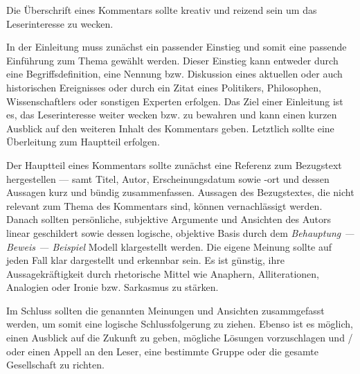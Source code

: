 \begin{enumerate}


	Die \"{U}berschrift eines Kommentars sollte kreativ und reizend sein um das Leserinteresse zu wecken.


	In der Einleitung muss zun\"{a}chst ein passender Einstieg und somit eine passende Einf\"{u}hrung zum Thema gew\"{a}hlt werden. Dieser Einstieg kann entweder durch eine Begriffsdefinition, eine Nennung bzw. Diskussion eines aktuellen oder auch historischen Ereignisses oder durch ein Zitat eines Politikers, Philosophen, Wissenschaftlers oder sonstigen Experten erfolgen. Das Ziel einer Einleitung ist es, das Leserinteresse weiter wecken bzw. zu bewahren und kann einen kurzen Ausblick auf den weiteren Inhalt des Kommentars geben. Letztlich sollte eine \"{U}berleitung zum Hauptteil erfolgen. 


	Der Hauptteil eines Kommentars sollte zun\"{a}chst eine Referenz zum Bezugstext hergestellen --- samt Titel, Autor, Erscheinungsdatum sowie -ort und dessen Aussagen kurz und b\"{u}ndig zusammenfassen. Aussagen des Bezugstextes, die nicht relevant zum Thema des Kommentars sind, k\"{o}nnen vernachl\"{a}ssigt werden. Danach sollten pers\"{o}nliche, subjektive Argumente und Ansichten des Autors linear geschildert sowie dessen logische, objektive Basis durch dem \emph{Behauptung --- Beweis --- Beispiel} Modell klargestellt werden. Die eigene Meinung sollte auf jeden Fall klar dargestellt und erkennbar sein. Es ist g\"{u}nstig, ihre Aussagekr\"{a}ftigkeit durch rhetorische Mittel wie Anaphern, Alliterationen, Analogien oder Ironie bzw. Sarkasmus zu st\"{a}rken.


	Im Schluss sollten die genannten Meinungen und Ansichten zusammgefasst werden, um somit eine logische Schlussfolgerung zu ziehen. Ebenso ist es m\"{o}glich, einen Ausblick auf die Zukunft zu geben, m\"{o}gliche L\"{o}sungen vorzuschlagen und / oder einen Appell an den Leser, eine bestimmte Gruppe oder die gesamte Gesellschaft zu richten.

\end{enumerate}

\pagebreak


